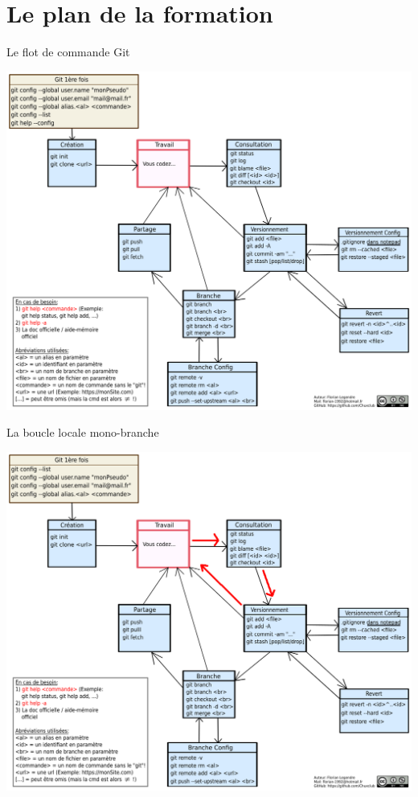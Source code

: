 \documentclass{beamer}
\begin{document}
\section{Le plan de la formation}

\begin{frame}{Le flot de commande Git}
\begin{center}
    \includegraphics[scale=0.28]{images/gitCommandFlow/gitCommandFlow.png}
\end{center}
\end{frame}

\begin{frame}{La boucle locale mono-branche}
\begin{center}
    \includegraphics[scale=0.28]{images/gitCommandFlow/gitCommandFlow_localLoop.png}
\end{center}
\end{frame}
\end{document}
